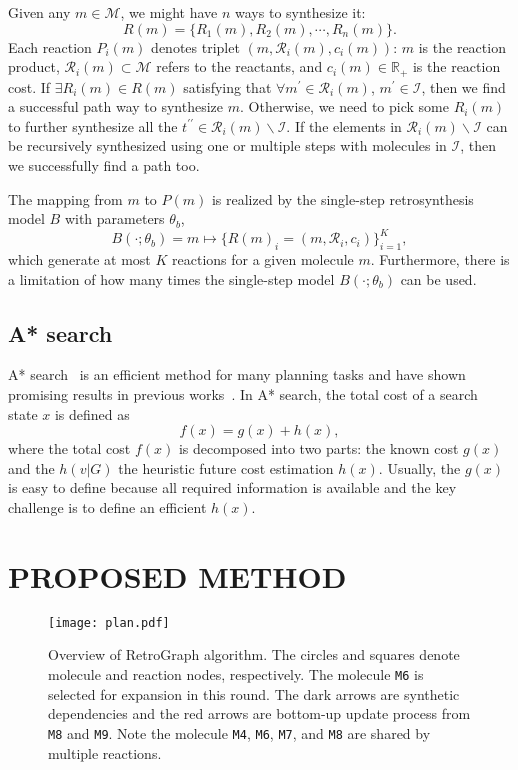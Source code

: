 \documentclass[sigconf]{acmart}
\begin{document}
Given any $m\in\mathcal{M}$, we might have $n$  ways to synthesize it:
\begin{equation}
R(m)=\{R_1(m), R_2(m),\cdots,R_n(m)\}.
\end{equation}
Each reaction $P_i(m)$ denotes triplet $(m,\mathcal{R}_i(m),c_i(m))$: $m$ is the reaction product, $\mathcal{R}_i(m)\subset\mathcal{M}$ refers to the reactants, and $c_i(m)\in\mathbb{R}_+$ is the reaction cost. If $\exists R_i(m)\in R(m)$ satisfying that  $\forall m^\prime\in\mathcal{R}_i(m)$, $m^\prime\in\mathcal{I}$, then we find a successful path way to synthesize $m$. Otherwise, we need to pick some $R_i(m)$ to further synthesize all the $t^{\prime\prime}\in \mathcal{R}_i(m)\backslash \mathcal{I}$. If the elements in $\mathcal{R}_i(m)\backslash \mathcal{I}$ can be recursively synthesized using one or multiple steps with molecules in $\mathcal{I}$, then we successfully find a path too.


The mapping from $m$ to $P(m)$ is realized by the single-step retrosynthesis model $B$ with parameters $\theta_b$,
\begin{equation}
    B(\cdot; \theta_b) = m \mapsto \{R(m)_i = (m, \mathcal{R}_i, c_i)\}_{i=1}^{K},
\end{equation}
which generate at most $K$ reactions for a given molecule $m$.
Furthermore, there is a limitation of how many times the single-step model $B(\cdot; \theta_b)$ can be used.


\subsection{A* search}
A* search~\cite{hart1968} is an efficient method for many planning tasks and have shown promising results in previous works~\cite{Chen2020, Kim2021}.
In A* search, the total cost of a search state $x$ is defined as
\begin{equation}\label{eq:rawastar}
    f(x) = g(x) + h(x),
\end{equation}
where the total cost $f(x)$ is decomposed into two parts: the known cost $g(x)$ and the $h(v|G)$ the heuristic future cost estimation $h(x)$.
Usually, the $g(x)$ is easy to define because all required information is available and the key challenge is to define an efficient $h(x)$.
\section{PROPOSED METHOD}
\begin{figure*}[!htbp]
    \centering
    \texttt{[image: plan.pdf]}
\caption{Overview of RetroGraph algorithm. The circles and squares denote molecule and reaction nodes, respectively. The molecule \texttt{M6} is selected for expansion in this round. The dark arrows are synthetic dependencies and the red arrows are bottom-up update process from \texttt{M8} and \texttt{M9}. Note the molecule \texttt{M4}, \texttt{M6}, \texttt{M7}, and \texttt{M8} are shared by multiple reactions.}
    \label{fig:system}
\end{figure*}
\end{document}
